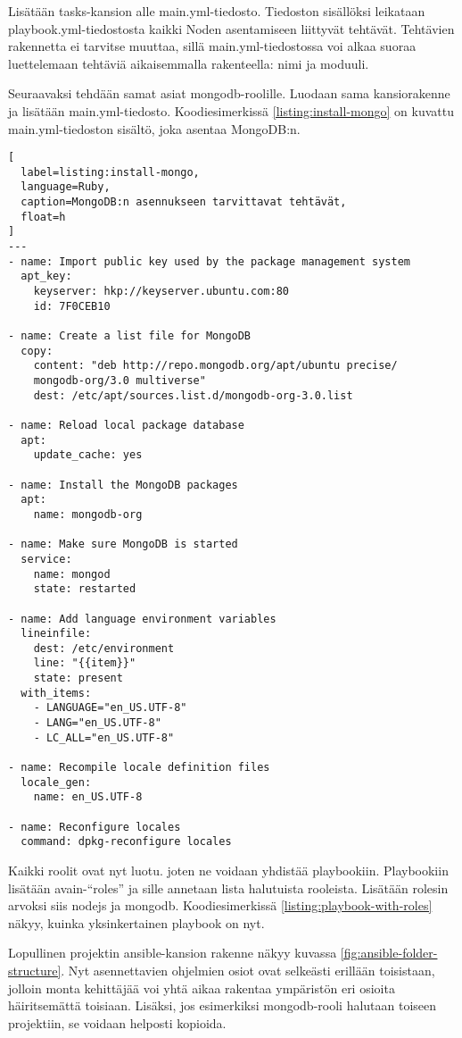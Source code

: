 Lisätään tasks-kansion alle main.yml-tiedosto. Tiedoston sisällöksi leikataan playbook.yml-tiedostosta kaikki Noden asentamiseen liittyvät tehtävät. Tehtävien rakennetta ei tarvitse muuttaa, sillä main.yml-tiedostossa voi alkaa suoraa luettelemaan tehtäviä aikaisemmalla rakenteella: nimi ja moduuli.

Seuraavaksi tehdään samat asiat mongodb-roolille. Luodaan sama kansiorakenne ja lisätään main.yml-tiedosto. Koodiesimerkissä \ref{listing:install-mongo} on kuvattu main.yml-tiedoston sisältö, joka asentaa MongoDB:n.

\begin{lstlisting}[
  label=listing:install-mongo,
  language=Ruby,
  caption=MongoDB:n asennukseen tarvittavat tehtävät,
  float=h
]
---
- name: Import public key used by the package management system
  apt_key:
    keyserver: hkp://keyserver.ubuntu.com:80
    id: 7F0CEB10

- name: Create a list file for MongoDB
  copy:
    content: "deb http://repo.mongodb.org/apt/ubuntu precise/
    mongodb-org/3.0 multiverse"
    dest: /etc/apt/sources.list.d/mongodb-org-3.0.list

- name: Reload local package database
  apt:
    update_cache: yes

- name: Install the MongoDB packages
  apt:
    name: mongodb-org

- name: Make sure MongoDB is started
  service:
    name: mongod
    state: restarted

- name: Add language environment variables
  lineinfile:
    dest: /etc/environment
    line: "{{item}}"
    state: present
  with_items:
    - LANGUAGE="en_US.UTF-8"
    - LANG="en_US.UTF-8"
    - LC_ALL="en_US.UTF-8"

- name: Recompile locale definition files
  locale_gen:
    name: en_US.UTF-8

- name: Reconfigure locales
  command: dpkg-reconfigure locales
\end{lstlisting}

Kaikki roolit ovat nyt luotu. joten ne voidaan yhdistää playbookiin. Playbookiin lisätään avain-\enquote{roles} ja sille annetaan lista halutuista rooleista. Lisätään rolesin arvoksi siis nodejs ja mongodb. Koodiesimerkissä \ref{listing:playbook-with-roles} näkyy, kuinka yksinkertainen playbook on nyt.

Lopullinen projektin ansible-kansion rakenne näkyy kuvassa \ref{fig:ansible-folder-structure}. Nyt asennettavien ohjelmien osiot ovat selkeästi erillään toisistaan, jolloin monta kehittäjää voi yhtä aikaa rakentaa ympäristön eri osioita häiritsemättä toisiaan. Lisäksi, jos esimerkiksi mongodb-rooli halutaan toiseen projektiin, se voidaan helposti kopioida.

